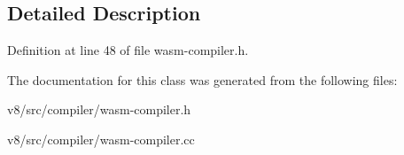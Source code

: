 \subsection{Detailed Description}


Definition at line 48 of file wasm-\/compiler.\+h.



The documentation for this class was generated from the following files\+:\begin{DoxyCompactItemize}
\item 
v8/src/compiler/wasm-\/compiler.\+h\item 
v8/src/compiler/wasm-\/compiler.\+cc\end{DoxyCompactItemize}
